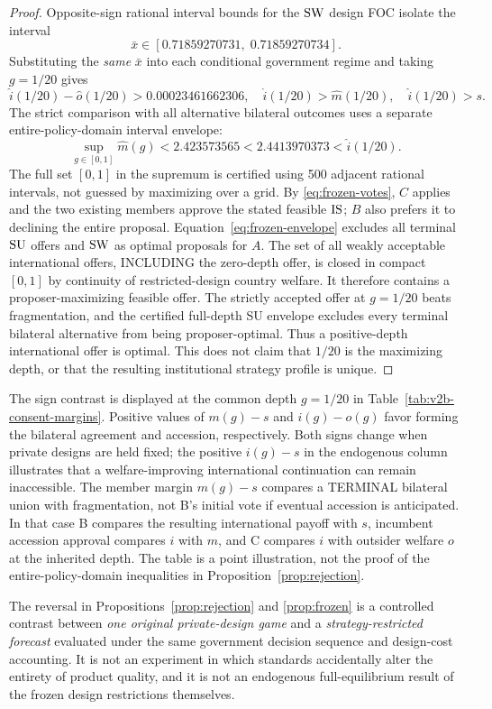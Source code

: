 \begin{proof}
Opposite-sign rational interval bounds for the $\mathrm{SW}$
design FOC isolate the interval
\[
 \bar x\in[0.71859270731,\;0.71859270734].
\]
Substituting the \emph{same} $\bar x$ into each
conditional government regime and taking $g=1/20$ gives
\begin{equation}\label{eq:frozen-votes}
 \widehat{i}(1/20)-\widehat{o}(1/20)
    >0.00023461662306,\quad
 \widehat{i}(1/20)>\widehat{m}(1/20),\quad
 \widehat{i}(1/20)>s.
\end{equation}
The strict comparison with all alternative bilateral outcomes
uses a separate entire-policy-domain interval envelope:
\begin{equation}\label{eq:frozen-envelope}
 \sup_{g\in[0,1]}\widehat{m}(g)
       <2.423573565
       <2.4413970373
       <\widehat{i}(1/20).
\end{equation}
The full set $[0,1]$ in the supremum is certified using
500 adjacent rational intervals, not guessed by maximizing
over a grid. By \eqref{eq:frozen-votes}, $C$ applies and the
two existing members approve the stated feasible $\mathrm{IS}$;
$B$ also prefers it to declining the entire proposal.
Equation~\eqref{eq:frozen-envelope} excludes all terminal
$\mathrm{SU}$ offers and $\mathrm{SW}$ as optimal proposals for $A$.
The set of all weakly acceptable international offers,
INCLUDING the zero-depth offer, is closed in compact $[0,1]$
by continuity of restricted-design country welfare.
It therefore contains a proposer-maximizing feasible offer.
The strictly accepted offer at $g=1/20$ beats fragmentation,
and the certified full-depth SU envelope excludes every
terminal bilateral alternative from being proposer-optimal.
Thus a positive-depth international offer is optimal.
This does not claim that $1/20$ is the maximizing depth,
or that the resulting institutional strategy profile is unique.
\end{proof}

The sign contrast is displayed at the common depth $g=1/20$ in
Table~\ref{tab:v2b-consent-margins}. Positive values of
$m(g)-s$ and $i(g)-o(g)$ favor forming the bilateral agreement
and accession, respectively. Both signs change when private
designs are held fixed; the positive $i(g)-s$ in the
endogenous column illustrates that a welfare-improving
international continuation can remain inaccessible.
The member margin $m(g)-s$ compares a TERMINAL bilateral union
with fragmentation, not B's initial vote if eventual
accession is anticipated. In that case B compares the
resulting international payoff with $s$, incumbent accession
approval compares $i$ with $m$, and C compares $i$ with
outsider welfare $o$ at the inherited depth.
The table is a point illustration, not the proof of the
entire-policy-domain inequalities in Proposition~\ref{prop:rejection}.


The reversal in Propositions~\ref{prop:rejection}
and \ref{prop:frozen} is a controlled contrast between
\emph{one original private-design game} and a
\emph{strategy-restricted forecast} evaluated under the
same government decision sequence and design-cost accounting.
It is not an experiment in which standards accidentally alter
the entirety of product quality, and it is not an
endogenous full-equilibrium result of the frozen design
restrictions themselves.
